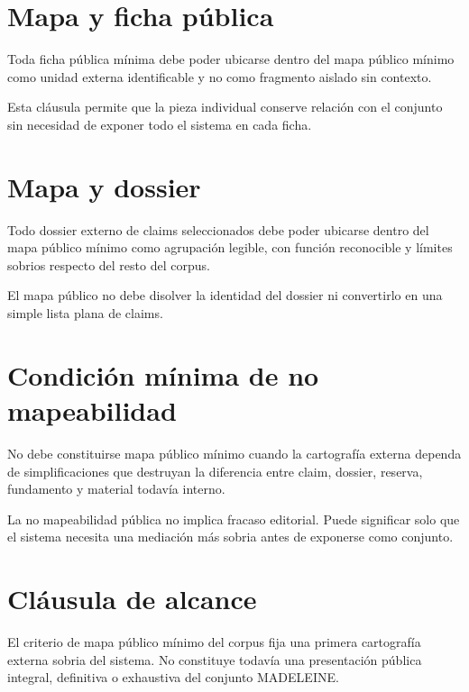 \section{Mapa y ficha pública}
\begin{definition}
Toda ficha pública mínima debe poder ubicarse dentro del mapa público mínimo como unidad externa identificable y no como fragmento aislado sin contexto.
\end{definition}

\begin{observation}
Esta cláusula permite que la pieza individual conserve relación con el conjunto sin necesidad de exponer todo el sistema en cada ficha.
\end{observation}

\section{Mapa y dossier}
\begin{definition}
Todo dossier externo de claims seleccionados debe poder ubicarse dentro del mapa público mínimo como agrupación legible, con función reconocible y límites sobrios respecto del resto del corpus.
\end{definition}

\begin{observation}
El mapa público no debe disolver la identidad del dossier ni convertirlo en una simple lista plana de claims.
\end{observation}

\section{Condición mínima de no mapeabilidad}
\begin{definition}
No debe constituirse mapa público mínimo cuando la cartografía externa dependa de simplificaciones que destruyan la diferencia entre claim, dossier, reserva, fundamento y material todavía interno.
\end{definition}

\begin{observation}
La no mapeabilidad pública no implica fracaso editorial. Puede significar solo que el sistema necesita una mediación más sobria antes de exponerse como conjunto.
\end{observation}

\section{Cláusula de alcance}
\begin{observation}
El criterio de mapa público mínimo del corpus fija una primera cartografía externa sobria del sistema. No constituye todavía una presentación pública integral, definitiva o exhaustiva del conjunto MADELEINE.
\end{observation}

